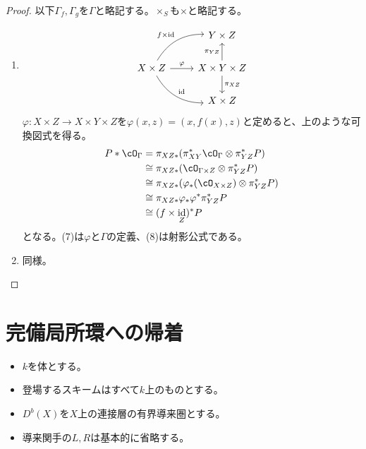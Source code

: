 \documentclass[uplatex, a4paper, dvipdfmx]{jsarticle}
\theoremstyle{definition}
\DeclareMathOperator{\id}{\mathrm{id}}
\begin{document}
\begin{proof}
    以下$\Gamma_f, \Gamma_g$を$\Gamma$と略記する。$\times_S$も$\times$と略記する。
    \begin{enumerate}
        \item \[
                  \begin{tikzcd}
                      & Y \times Z\\
                      X \times Z \ar[r, "\varphi"] \ar[rd, bend right, "\id"] \ar[ru, "f \times \id", bend left]& X \times Y \times Z \ar[d, "\pi_{XZ}"] \ar[u, "\pi_{YZ}"]\\
                      &X \times Z
                  \end{tikzcd}
              \]
              $\varphi \colon X \times Z \to X \times Y \times Z$を$\varphi(x, z) = (x, f(x), z)$と定めると、上のような可換図式を得る。
              \begin{align}
                  P * \cO_\Gamma & = \pi_{XZ*}(\pi_{XY}^*\cO_{\Gamma} \otimes \pi_{YZ}^*P)        \\
                                 & \cong \pi_{XZ*}(\cO_{\Gamma \times Z}\otimes\pi_{YZ}^*P)       \\
                                 & \cong \pi_{XZ*}(\varphi_*(\cO_{X \times Z})\otimes\pi_{YZ}^*P) \\
                                 & \cong \pi_{XZ*}\varphi_*\varphi^*\pi_{YZ}^*P                   \\
                                 & \cong (f \times \id_Z)^*P
              \end{align}
              となる。(7)は$\varphi$と$\Gamma$の定義、(8)は射影公式である。
        \item 同様。
    \end{enumerate}
\end{proof}

\section{完備局所環への帰着}
\begin{itemize}
    \item $k$を体とする。
    \item 登場するスキームはすべて$k$上のものとする。
    \item $D^b(X)$を$X$上の連接層の有界導来圏とする。
    \item 導来関手の$L, R$は基本的に省略する。
\end{itemize}
\end{document}
